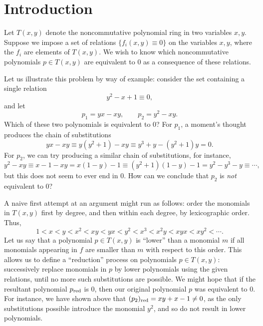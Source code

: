\section{Introduction}\label{sec:introduction}

Let $T(x,y)$ denote the noncommutative polynomial ring in two variables $x,y$. Suppose we impose a set of relations $\{f_i(x,y)\equiv 0\}$ on the variables $x,y$, where the $f_i$ are elements of $T(x,y)$. We wish to know which noncommutative polynomials $p\in T(x,y)$ are equivalent to $0$ as a consequence of these relations.

Let us illustrate this problem by way of example: consider the set containing a single relation
\begin{equation}
\label{eqn:relations}
y^2-x+1\equiv 0,
\end{equation}
and let
\begin{equation*}
p_1=yx-xy,\qquad p_2=y^2-xy.
\end{equation*}
Which of these two polynomials is equivalent to $0$? For $p_1$, a moment's thought produces the chain of substitutions
\begin{equation}
\label{eqn:p1}
yx-xy\equiv y(y^2+1)-xy\equiv y^3+y-(y^2+1)y=0.
\end{equation}
For $p_2$, we can try producing a similar chain of substitutions, for instance,
\begin{equation*}
y^2-xy\equiv x-1-xy=x(1-y)-1\equiv(y^2+1)(1-y)-1=y^2-y^3-y\equiv\cdots,
\end{equation*}
but this does not seem to ever end in $0$. How can we conclude that $p_2$ is \emph{not} equivalent to $0$?

A naive first attempt at an argument might run as follows: order the monomials in $T(x,y)$ first by degree, and then within each degree, by lexicographic order. Thus,
\begin{equation}\label{eq:deglex-two-variables}
1<x<y<x^2<xy<yx<y^2<x^3<x^2y<xyx<xy^2<\cdots.
\end{equation}
Let us say that a polynomial $p\in T(x,y)$ is ``lower'' than a monomial $m$ if all monomials appearing in $f$ are smaller than $m$ with respect to this order. This allows us to define a ``reduction'' process on polynomials $p\in T(x,y)$: successively replace monomials in $p$ by lower polynomials using the given relations, until no more such substitutions are possible. We might hope that if the resultant polynomial $p_{\mathrm{red}}$ is $0$, then our original polynomial $p$ was equivalent to $0$. For instance, we have shown above that $(p_2)_{\mathrm{red}}=xy+x-1\ne 0$, as the only substitutions possible introduce the monomial $y^2$, and so do not result in lower polynomials.

